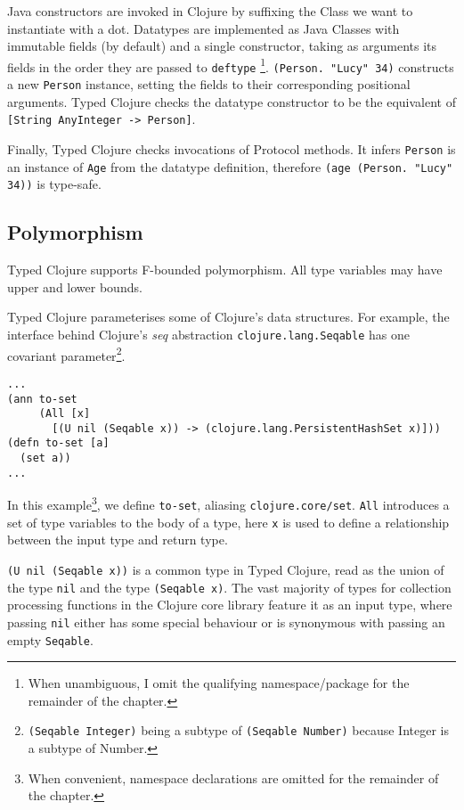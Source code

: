 Java constructors are invoked in Clojure by suffixing the Class we want to instantiate with a dot.
Datatypes are implemented as Java Classes with immutable fields (by default) and a single constructor, taking as arguments its fields 
in the order they are passed to \lstinline|deftype|
\footnote{When unambiguous, I omit the qualifying namespace/package for the remainder of the chapter.}.
\lstinline|(Person. "Lucy" 34)| constructs a new \lstinline|Person|
instance, setting the fields to their corresponding positional arguments.
Typed Clojure checks the datatype constructor to be the equivalent of 
\lstinline|[String AnyInteger -> Person]|.

Finally, Typed Clojure checks invocations of Protocol methods. It infers \lstinline|Person|
is an instance of \lstinline|Age| from the datatype definition, therefore \lstinline|(age (Person. "Lucy" 34))| is type-safe.

\subsection{Polymorphism}

Typed Clojure supports F-bounded polymorphism. All type variables may have
upper and lower bounds.

Typed Clojure parameterises some of Clojure's data structures. For example,
the interface behind Clojure's \emph{seq} abstraction \lstinline|clojure.lang.Seqable| has one 
covariant parameter\footnote{\lstinline|(Seqable Integer)| being a subtype of \lstinline|(Seqable Number)|
because Integer is a subtype of Number.}.

\begin{lstlisting}
...
(ann to-set 
     (All [x]
       [(U nil (Seqable x)) -> (clojure.lang.PersistentHashSet x)]))
(defn to-set [a]
  (set a))
...
\end{lstlisting}

In this example\footnote{When convenient, namespace declarations are omitted for the remainder of the chapter.}, 
we define \lstinline|to-set|, aliasing \lstinline|clojure.core/set|.
\lstinline|All| introduces a set of type variables to the body of a type,
here \lstinline|x| is used to define a relationship between the input type and return type.

\lstinline|(U nil (Seqable x))| is a common type in Typed Clojure, read as the union
of the type \lstinline|nil| and the type \lstinline|(Seqable x)|.
The vast majority of types for collection processing functions in the Clojure core library feature
it as an input type, where passing \lstinline|nil| either has some special behaviour 
or is synonymous with passing an empty \lstinline|Seqable|.

